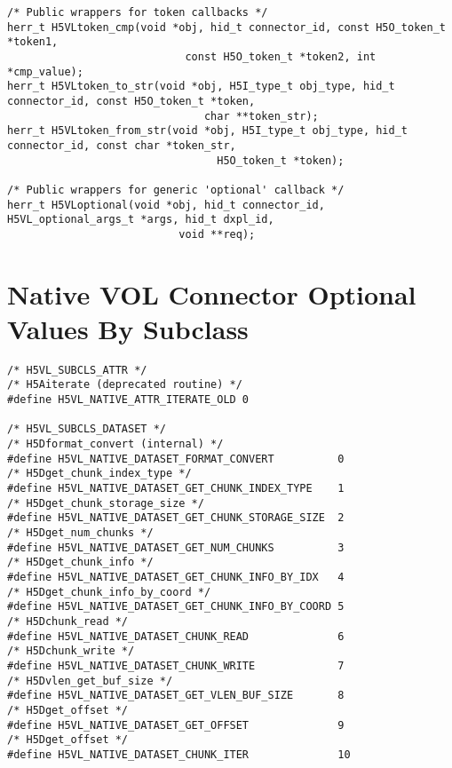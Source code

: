 \begin{appendices}
\begin{lstlisting}
/* Public wrappers for token callbacks */
herr_t H5VLtoken_cmp(void *obj, hid_t connector_id, const H5O_token_t *token1,
                            const H5O_token_t *token2, int *cmp_value);
herr_t H5VLtoken_to_str(void *obj, H5I_type_t obj_type, hid_t connector_id, const H5O_token_t *token,
                               char **token_str);
herr_t H5VLtoken_from_str(void *obj, H5I_type_t obj_type, hid_t connector_id, const char *token_str,
                                 H5O_token_t *token);

/* Public wrappers for generic 'optional' callback */
herr_t H5VLoptional(void *obj, hid_t connector_id, H5VL_optional_args_t *args, hid_t dxpl_id,
                           void **req);
\end{lstlisting}

\pagebreak

\section{Native VOL Connector Optional Values By Subclass}
\label{sec:C}

\begin{lstlisting}
/* H5VL_SUBCLS_ATTR */
/* H5Aiterate (deprecated routine) */
#define H5VL_NATIVE_ATTR_ITERATE_OLD 0 

/* H5VL_SUBCLS_DATASET */
/* H5Dformat_convert (internal) */
#define H5VL_NATIVE_DATASET_FORMAT_CONVERT          0  
/* H5Dget_chunk_index_type */
#define H5VL_NATIVE_DATASET_GET_CHUNK_INDEX_TYPE    1  
/* H5Dget_chunk_storage_size */
#define H5VL_NATIVE_DATASET_GET_CHUNK_STORAGE_SIZE  2  
/* H5Dget_num_chunks */
#define H5VL_NATIVE_DATASET_GET_NUM_CHUNKS          3  
/* H5Dget_chunk_info */
#define H5VL_NATIVE_DATASET_GET_CHUNK_INFO_BY_IDX   4  
/* H5Dget_chunk_info_by_coord */
#define H5VL_NATIVE_DATASET_GET_CHUNK_INFO_BY_COORD 5  
/* H5Dchunk_read */
#define H5VL_NATIVE_DATASET_CHUNK_READ              6  
/* H5Dchunk_write */
#define H5VL_NATIVE_DATASET_CHUNK_WRITE             7  
/* H5Dvlen_get_buf_size */
#define H5VL_NATIVE_DATASET_GET_VLEN_BUF_SIZE       8  
/* H5Dget_offset */
#define H5VL_NATIVE_DATASET_GET_OFFSET              9  
/* H5Dget_offset */
#define H5VL_NATIVE_DATASET_CHUNK_ITER              10 


\end{lstlisting}
\end{appendices}
